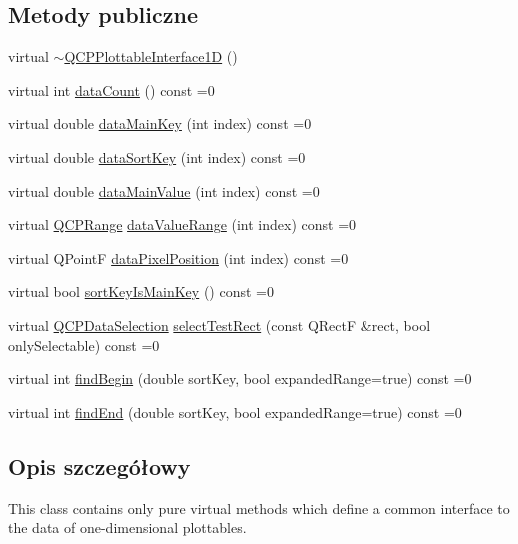 \subsection*{Metody publiczne}
\begin{DoxyCompactItemize}
\item 
virtual \hyperlink{class_q_c_p_plottable_interface1_d_a8829011d62208625f741f2d7e1cb6280}{$\sim$\+Q\+C\+P\+Plottable\+Interface1D} ()
\item 
virtual int \hyperlink{class_q_c_p_plottable_interface1_d_a058a22c770ef4d5a0e878a7f02183da9}{data\+Count} () const =0
\item 
virtual double \hyperlink{class_q_c_p_plottable_interface1_d_a2bd60daaac046945fead558cbd83cf73}{data\+Main\+Key} (int index) const =0
\item 
virtual double \hyperlink{class_q_c_p_plottable_interface1_d_afdc92f9f01e7e35f2e96b2ea9dc14ae7}{data\+Sort\+Key} (int index) const =0
\item 
virtual double \hyperlink{class_q_c_p_plottable_interface1_d_af6330919e8023277d08c958a6074fc76}{data\+Main\+Value} (int index) const =0
\item 
virtual \hyperlink{class_q_c_p_range}{Q\+C\+P\+Range} \hyperlink{class_q_c_p_plottable_interface1_d_a9ca7fcf14d885a200879768679b19be9}{data\+Value\+Range} (int index) const =0
\item 
virtual Q\+PointF \hyperlink{class_q_c_p_plottable_interface1_d_a78911838cfbcfd2d8df9ad2fdbfb8e93}{data\+Pixel\+Position} (int index) const =0
\item 
virtual bool \hyperlink{class_q_c_p_plottable_interface1_d_a229e65e7ab968dd6cd0e259fa504b79d}{sort\+Key\+Is\+Main\+Key} () const =0
\item 
virtual \hyperlink{class_q_c_p_data_selection}{Q\+C\+P\+Data\+Selection} \hyperlink{class_q_c_p_plottable_interface1_d_a67093e4ccf490ff5f7750640941ff34c}{select\+Test\+Rect} (const Q\+RectF \&rect, bool only\+Selectable) const =0
\item 
virtual int \hyperlink{class_q_c_p_plottable_interface1_d_a5b95783271306a4de97be54eac1e7d13}{find\+Begin} (double sort\+Key, bool expanded\+Range=true) const =0
\item 
virtual int \hyperlink{class_q_c_p_plottable_interface1_d_a5deced1016bc55a41a2339619045b295}{find\+End} (double sort\+Key, bool expanded\+Range=true) const =0
\end{DoxyCompactItemize}


\subsection{Opis szczegółowy}
This class contains only pure virtual methods which define a common interface to the data of one-\/dimensional plottables.

